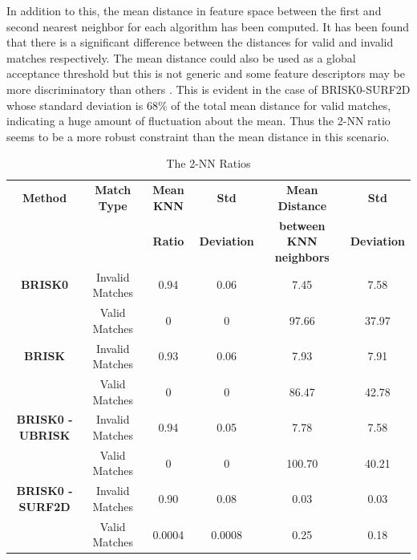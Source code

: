\documentclass[11pt]{report}
\begin{document}
In addition to this, the mean distance in feature space between the first and second nearest neighbor for each algorithm has been computed. It has been found that there is a significant difference between the distances for valid and invalid matches respectively. The mean distance could also be used as a global acceptance threshold but this is not generic and some feature descriptors may be more discriminatory than others \cite{Lowe2004}. This is evident in the case of BRISK0-SURF2D whose standard deviation is $68\%$ of the total mean distance for valid matches, indicating a huge amount of fluctuation about the mean. Thus the 2-NN ratio seems to be a more robust constraint than the mean distance in this scenario.\\

\begin{table}
\caption{The 2-NN Ratios}
\footnotesize
\begin{tabular}{|c|c|c|c|c|c|}
\hline 
\textbf{Method} & \textbf{Match Type} & \textbf{Mean KNN} & \textbf{Std } & \textbf{Mean Distance } & \textbf{Std }\tabularnewline
 &  & \textbf{ Ratio} & \textbf{Deviation} & \textbf{between KNN neighbors} & \textbf{Deviation}\tabularnewline
\hline 
\hline 
\textbf{BRISK0} & Invalid Matches & 0.94 & 0.06 & 7.45 & 7.58\tabularnewline
\hline 
 & Valid Matches & 0 & 0 & 97.66 & 37.97\tabularnewline
\hline 
\textbf{BRISK} & Invalid Matches & 0.93 & 0.06 & 7.93 & 7.91\tabularnewline
\hline 
 & Valid Matches & 0 & 0 & 86.47 & 42.78\tabularnewline
\hline 
\textbf{BRISK0 - UBRISK} & Invalid Matches & 0.94 & 0.05 & 7.78 & 7.58\tabularnewline
\hline 
 & Valid Matches & 0 & 0 & 100.70 & 40.21\tabularnewline
\hline 
\textbf{BRISK0 - SURF2D} & Invalid Matches & 0.90 & 0.08 & 0.03 & 0.03\tabularnewline
\hline 
 & Valid Matches & 0.0004 & 0.0008 & 0.25 & 0.18\tabularnewline
\hline 
\end{tabular}
\label{tab:knnCriterion}
\end{table}
\end{document}
